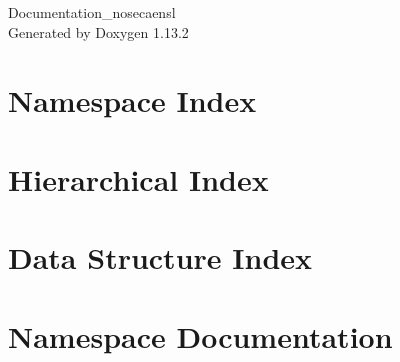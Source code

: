 \documentclass[twoside]{book}
\newcommand{\+}{\discretionary{\mbox{\scriptsize$\hookleftarrow$}}{}{}}
\newcommand{\clearemptydoublepage}{%
    \newpage{\pagestyle{empty}\cleardoublepage}%
  }
\begin{document}
  \raggedbottom
    \hypersetup{pageanchor=false,
                bookmarksnumbered=true,
                pdfencoding=unicode
               }
  \begin{titlepage}
  \vspace*{7cm}
  \begin{center}%
  {\Large Documentation\+\_\+nosecaensl}\\
  \vspace*{1cm}
  {\large Generated by Doxygen 1.13.2}\\
  \end{center}
  \end{titlepage}
  \clearemptydoublepage
  \tableofcontents
  \clearemptydoublepage
  \hypersetup{pageanchor=true}
\chapter{Namespace Index}

\chapter{Hierarchical Index}

\chapter{Data Structure Index}

\chapter{Namespace Documentation}

\end{document}
